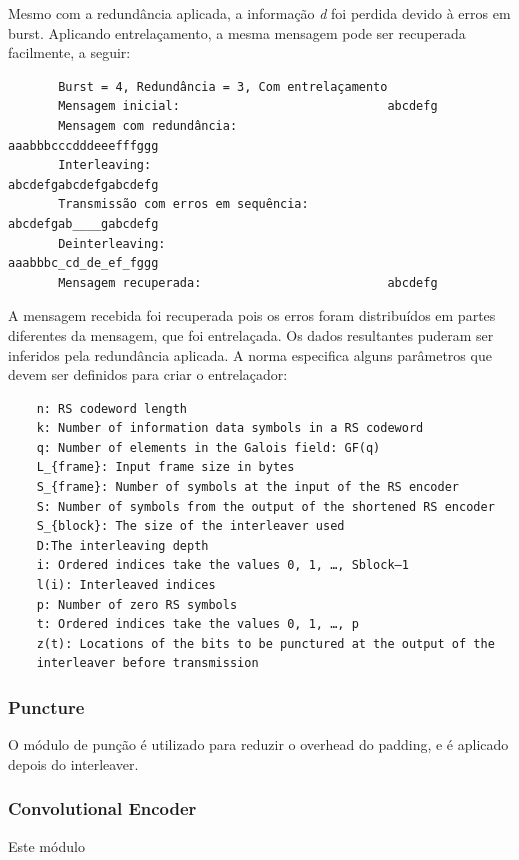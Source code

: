 	Mesmo com a redundância aplicada, a informação \textit{d} foi perdida devido à erros em burst. Aplicando entrelaçamento, a mesma mensagem pode ser recuperada facilmente, a seguir:
	
	\begin{verbatim}
	   Burst = 4, Redundância = 3, Com entrelaçamento
	   Mensagem inicial:                             abcdefg
	   Mensagem com redundância:                     aaabbbcccdddeeefffggg
	   Interleaving:                                 abcdefgabcdefgabcdefg
	   Transmissão com erros em sequência:           abcdefgab____gabcdefg
	   Deinterleaving:                               aaabbbc_cd_de_ef_fggg
	   Mensagem recuperada:                          abcdefg
	\end{verbatim}
	
	A mensagem recebida foi recuperada pois os erros foram distribuídos em partes diferentes da mensagem, que foi entrelaçada. Os dados resultantes puderam ser inferidos pela redundância aplicada. A norma especifica alguns parâmetros que devem ser definidos para criar o entrelaçador:
	
	\begin{verbatim}
	n: RS codeword length
	k: Number of information data symbols in a RS codeword
	q: Number of elements in the Galois field: GF(q)
	L_{frame}: Input frame size in bytes
	S_{frame}: Number of symbols at the input of the RS encoder
	S: Number of symbols from the output of the shortened RS encoder
	S_{block}: The size of the interleaver used
	D:The interleaving depth
	i: Ordered indices take the values 0, 1, …, Sblock–1
	l(i): Interleaved indices
	p: Number of zero RS symbols
	t: Ordered indices take the values 0, 1, …, p
	z(t): Locations of the bits to be punctured at the output of the 
	interleaver before transmission 
	\end{verbatim}
	
	\subsubsection{Puncture}
	
	O módulo de punção é utilizado para reduzir o overhead do padding, e é aplicado depois do interleaver.
	
	\subsubsection{Convolutional Encoder}
	
	Este módulo 
	
